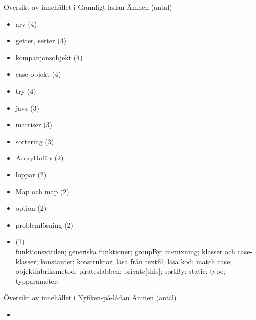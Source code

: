 

\ifkompendium\else

\begin{Slide}{Översikt av innehållet i Grumligt-lådan}\SlideFontSmall
Ämnen (antal)
\begin{multicols}{2}
\begin{itemize}\SlideFontTiny
\item arv (4)
\item getter, setter (4)
\item kompanjonsobjekt (4)
\item case-objekt (4)
\item try (4)
\item java (3)
\item matriser (3)
\item sortering (3)
\item ArrayBuffer (2)
\item loppar (2)
\item Map och map (2)
\item option (2)
\item problemlösning (2)
\item (1) \\
funktionsvärden; 
generiska funktioner;
groupBy;
in-mixning;
klasser och case-klasser;
konstanter;
konstruktor;
läsa från textfil;
läsa kod;
match case;
objektfabriksmetod;
pirateslabben;
private[this];
sortBy;
static;
type;
typparameter;

\end{itemize}
\end{multicols}
\end{Slide}

\begin{Slide}{Översikt av innehållet i Nyfiken-på-lådan}\SlideFontSmall
Ämnen (antal)
\begin{multicols}{2}
\begin{itemize}\SlideFontTiny
\item 
\end{itemize}
\end{multicols}
\end{Slide}


\fi










